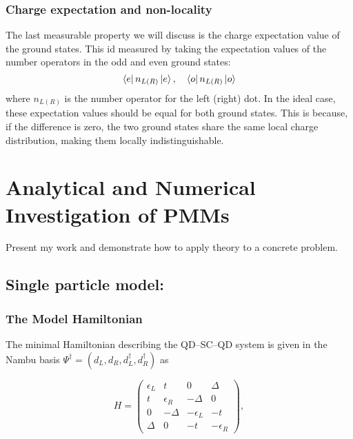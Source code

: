 \documentclass[11pt, letterpaper, titlepage]{article}
\begin{document}
\subsubsection{Charge expectation and non-locality}
The last measurable property we will discuss is the charge expectation value of the ground states. This id measured by taking the expectation values of the number operators in the odd and even ground states:
$$
\bra{e}n_{L(R)} \ket{e}, \quad \bra{o}n_{L(R)} \ket{o}
$$
where $n_{L(R)}$ is the number operator for the left (right) dot. In the ideal case, these expectation values should be equal for both ground states. This is because, if the difference is zero, the two ground states share the same local charge distribution, making them locally indistinguishable. 




















\section{Analytical and Numerical Investigation of PMMs}
Present my work and demonstrate how to apply theory to a concrete problem.\par
\subsection{Single particle model:}
\subsubsection{The Model Hamiltonian}

The minimal Hamiltonian describing the QD–SC–QD system is given in the Nambu basis $\Psi^\dagger = (d_L, d_R, d_L^\dagger, d_R^\dagger)$ as

\begin{equation}
  H = \begin{pmatrix}
    \epsilon_L & t & 0 & \Delta \\
    t & \epsilon_R & -\Delta & 0 \\
    0 & -\Delta & -\epsilon_L & -t \\
    \Delta & 0 & -t & -\epsilon_R
  \end{pmatrix},
\end{equation}
\end{document}
